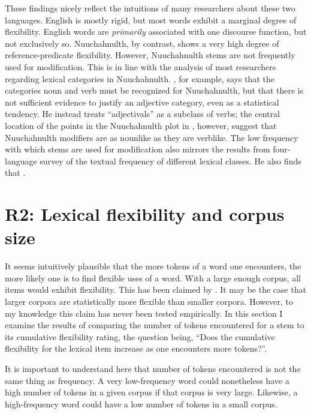 These findings nicely reflect the intuitions of many researchers about these two languages. English is mostly rigid, but most words exhibit a marginal degree of flexibility. English words are \emph{primarily} associated with one discourse function, but not exclusively so. Nuuchahnulth, by contrast, shows a very high degree of reference-predicate flexibility. However, Nuuchahnulth stems are not frequently used for modification. This is in line with the analysis of most researchers regarding lexical categories in Nuuchahnulth. \textcite[50]{Nakayama2001}, for example, says that the categories noun and verb must be recognized for Nuuchahnulth, but that there is not sufficient evidence to justify an adjective category, even as a statistical tendency. He instead treats \enquote{adjectivals} as a subclass of verbs; the central location of the points in the Nuuchahnulth plot in , however, suggest that Nuuchahnulth modifiers are as nounlike as they are verblike. The low frequency with which stems are used for modification also mirrors the results from  four-language survey of the textual frequency of different lexical classes. He also finds that .

\section{R2: Lexical flexibility and corpus size}
\label{sec:4.4}

It seems intuitively plausible that the more tokens of a word one encounters, the more likely one is to find flexible uses of a word. With a large enough corpus, all items would exhibit flexibility. This has been claimed by \textcite[77]{MoselHovdhaugen1992}. It may be the case that larger corpora are statistically more flexible than smaller corpora. However, to my knowledge this claim has never been tested empirically. In this section I examine the results of comparing the number of tokens encountered for a stem to its cumulative flexibility rating, the question being, \enquote{Does the cumulative flexibility for the lexical item increase as one encounters more tokens?}.

It is important to understand here that number of tokens encountered is not the same thing as frequency. A very low-frequency word could nonetheless have a high number of tokens in a given corpus if that corpus is very large. Likewise, a high-frequency word could have a low number of tokens in a small corpus.

